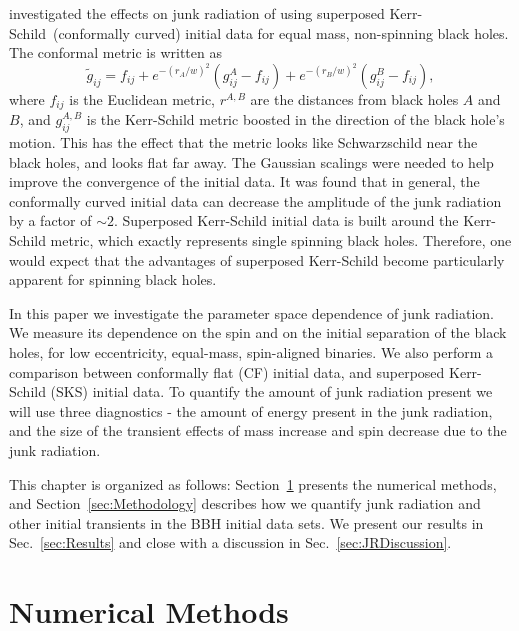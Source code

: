 \cite{Lovelace2009} investigated the effects on junk radiation of using
superposed Kerr-Schild~ (conformally curved) initial data for equal mass, non-spinning black
holes.  The conformal metric is written as
\begin{equation}
\tilde{g}_{ij}=f_{ij}+e^{-(r_A/w)^2}\left(g_{ij}^A-f_{ij}\right)+e^{-(r_B/w)^2}\left(g_{ij}^B-f_{ij}\right),
\end{equation}
where $f_{ij}$ is the Euclidean metric, $r^{A,B}$ are the distances
from black holes $A$ and $B$, and $g_{ij}^{A,B}$ is the Kerr-Schild metric boosted in
the direction of the black hole's motion. This has the effect that the
metric looks like Schwarzschild near the black holes, and looks flat
far away. The Gaussian scalings were needed to help improve the
convergence of the initial data. It was found that in general, the
conformally curved initial data can decrease the amplitude of the junk
radiation by a factor of $\sim 2$.
Superposed Kerr-Schild initial data is built around the
  Kerr-Schild metric, which exactly represents single spinning black holes.
 Therefore, one would expect that the advantages of superposed Kerr-Schild become particularly apparent for spinning black holes.

In this paper we investigate the parameter space dependence of junk
radiation. We measure its dependence on the spin and on the initial
separation of the black holes, for low eccentricity, equal-mass,
spin-aligned binaries. We also perform a comparison between conformally
flat (CF) initial data, and superposed Kerr-Schild (SKS) initial data. To
quantify the amount of junk radiation present we will use three
diagnostics - the amount of energy present in the junk radiation, and
the size of the transient effects of mass increase and spin decrease
due to the junk radiation.

This chapter is organized as follows: 
  Section~\ref{sec:NumericalMethods} presents the numerical methods,
  and Section~\ref{sec:Methodology} describes how we quantify junk
  radiation and other initial transients in the BBH initial data sets.
  We present our results in Sec.~\ref{sec:Results} and close with a discussion in Sec.~\ref{sec:JRDiscussion}.

\section{Numerical Methods}
\label{sec:NumericalMethods}

